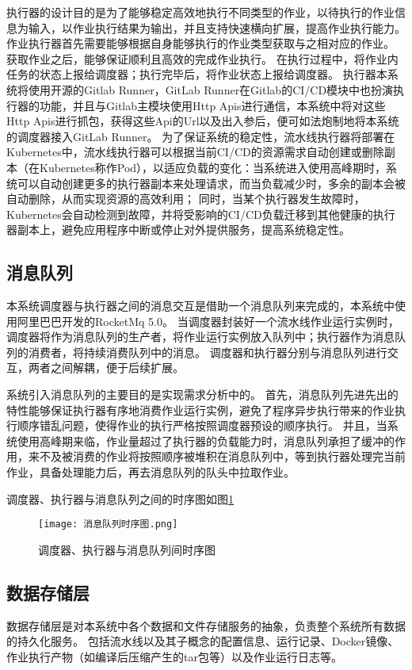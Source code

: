 执行器的设计目的是为了能够稳定高效地执行不同类型的作业，以待执行的作业信息为输入，以作业执行结果为输出，并且支持快速横向扩展，提高作业执行能力。
作业执行器首先需要能够根据自身能够执行的作业类型获取与之相对应的作业。
获取作业之后，能够保证顺利且高效的完成作业执行。
在执行过程中，将作业内任务的状态上报给调度器；执行完毕后，将作业状态上报给调度器。
执行器本系统将使用开源的Gitlab Runner，GitLab Runner在Gitlab的CI/CD模块中也扮演执行器的功能，并且与Gitlab主模块使用Http Apis进行通信，本系统中将对这些Http Apis进行抓包，获得这些Api的Url以及出入参后，便可如法炮制地将本系统的调度器接入GitLab Runner。
为了保证系统的稳定性，流水线执行器将部署在Kubernetes中，流水线执行器可以根据当前CI/CD的资源需求自动创建或删除副本（在Kubernetes称作Pod），以适应负载的变化：当系统进入使用高峰期时，系统可以自动创建更多的执行器副本来处理请求，而当负载减少时，多余的副本会被自动删除，从而实现资源的高效利用；
同时，当某个执行器发生故障时，Kubernetes会自动检测到故障，并将受影响的CI/CD负载迁移到其他健康的执行器副本上，避免应用程序中断或停止对外提供服务，提高系统稳定性。

\subsection{消息队列}

本系统调度器与执行器之间的消息交互是借助一个消息队列来完成的，本系统中使用阿里巴巴开发的RocketMq 5.0。
当调度器封装好一个流水线作业运行实例时，调度器将作为消息队列的生产者，将作业运行实例放入队列中；执行器作为消息队列的消费者，将持续消费队列中的消息。
调度器和执行器分别与消息队列进行交互，两者之间解耦，便于后续扩展。

系统引入消息队列的主要目的是实现需求分析中的。
首先，消息队列先进先出的特性能够保证执行器有序地消费作业运行实例，避免了程序异步执行带来的作业执行顺序错乱问题，使得作业的执行严格按照调度器预设的顺序执行。
并且，当系统使用高峰期来临，作业量超过了执行器的负载能力时，消息队列承担了缓冲的作用，来不及被消费的作业将按照顺序被堆积在消息队列中，等到执行器处理完当前作业，具备处理能力后，再去消息队列的队头中拉取作业。

调度器、执行器与消息队列之间的时序图如图\ref{fig:消息队列时序图}

\begin{figure}[h]
  \centering
  \texttt{[image: 消息队列时序图.png]}
  \caption{调度器、执行器与消息队列间时序图}
  \label{fig:消息队列时序图}
\end{figure}

\subsection{数据存储层}
数据存储层是对本系统中各个数据和文件存储服务的抽象，负责整个系统所有数据的持久化服务。
包括流水线以及其子概念的配置信息、运行记录、Docker镜像、作业执行产物（如编译后压缩产生的tar包等）以及作业运行日志等。

